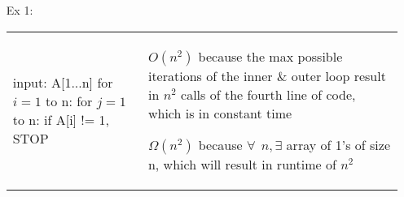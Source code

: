 \documentclass[11pt, oneside]{article}
\newcommand\tab[1][0.5cm]{\hspace*{#1}}
\begin{document}
\begin{itemize}
\item [Ex 1:] 
	\begin{tabular}{  l | l  } 
	\makecell[l]{		input: A[1...n] \\ 
				for $i=1$ to n: \\ 
				\tab for $j=1$ to n: \\
				\tab \tab if A[i] != 1, STOP}
	&	
	\makecell[l]{	$O(n^2)$ because the max possible iterations of the inner $\&$ outer loop \\
				result in $n^2$ calls of the fourth line of code, which is in constant time \\
				\\
				$\Omega(n^2)$ because $\forall \: \: n, \exists$ array of 1's of size n, \\
				which will result in runtime of $n^2$ } 
	\end{tabular}
\vspace{1em}


\end{itemize}
\end{document}
